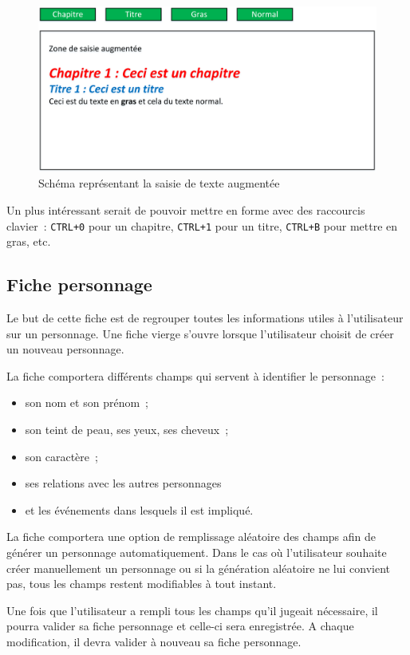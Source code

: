 \documentclass[a4paper,11pt,twoside]{article}
\begin{document}
\begin{figure}[!ht]
	\centerline{\includegraphics[scale=0.4]{saisie_texte_augmentee.png}}
    \caption{Schéma représentant la saisie de texte augmentée}
    \label{fig:saisie_texte_augmentee_UI}
\end{figure}

Un plus intéressant serait de pouvoir mettre en forme avec des raccourcis clavier~: \verb"CTRL+0" pour un chapitre, \verb"CTRL+1" pour un titre, \verb"CTRL+B" pour mettre en gras, etc.


\subsection{Fiche personnage}
Le but de cette fiche est de regrouper toutes les informations utiles à l'utilisateur sur un personnage. Une fiche vierge s'ouvre lorsque l'utilisateur choisit de créer un nouveau personnage.

La fiche comportera différents champs qui servent à identifier le personnage~:
\begin{itemize}
	\item son nom et son prénom~; 
	\item son teint de peau, ses yeux, ses cheveux~;
	\item son caractère~;
	\item ses relations avec les autres personnages
	\item et les événements dans lesquels il est impliqué.
\end{itemize}

La fiche comportera une option de remplissage aléatoire des champs afin de générer un personnage automatiquement. Dans le cas où l'utilisateur souhaite créer manuellement un personnage ou si la génération aléatoire ne lui convient pas, tous les champs restent modifiables à tout instant. 

Une fois que l'utilisateur a rempli tous les champs qu'il jugeait nécessaire, il pourra valider sa fiche personnage et celle-ci sera enregistrée. A chaque modification, il devra valider à nouveau sa fiche personnage.
\end{document}
